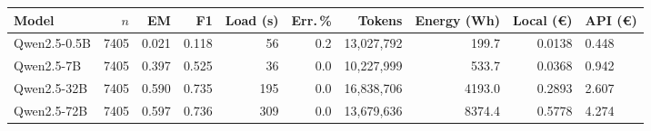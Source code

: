 \begin{tabular}{@{}l r r r r r r r r l@{}}
\toprule
Model & $n$ & EM & F1 & Load (s) & Err.\,\% & Tokens & Energy (Wh) & Local (\euro) & API (\euro) \\
\midrule
Qwen2.5-0.5B & 7405 & 0.021 & 0.118 & 56 & 0.2 & 13,027,792 & 199.7 & 0.0138 & 0.448 \\
Qwen2.5-7B & 7405 & 0.397 & 0.525 & 36 & 0.0 & 10,227,999 & 533.7 & 0.0368 & 0.942 \\
Qwen2.5-32B & 7405 & 0.590 & 0.735 & 195 & 0.0 & 16,838,706 & 4193.0 & 0.2893 & 2.607 \\
Qwen2.5-72B & 7405 & 0.597 & 0.736 & 309 & 0.0 & 13,679,636 & 8374.4 & 0.5778 & 4.274 \\
\bottomrule
\end{tabular}
